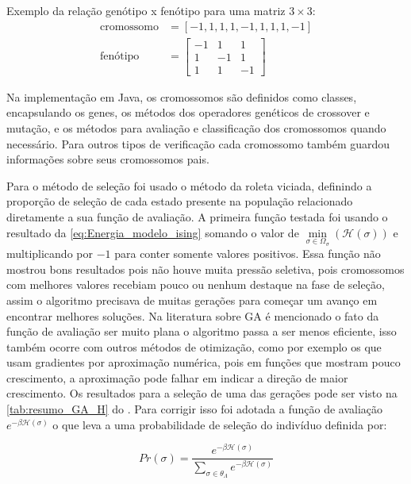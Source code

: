 Exemplo da relação genótipo x fenótipo para uma matriz \( 3 \times 3 \):
\begin{align*}
\text{cromossomo} &= \left[-1, 1, 1, 1, -1, 1, 1, 1, -1 \right]\\
\text{fenótipo} &= \begin{bmatrix}
-1 & 1 & 1 \\
1 & -1 & 1 \\
1 & 1 & -1
\end{bmatrix}
\end{align*}

Na implementação em Java, os cromossomos são definidos como classes, encapsulando os genes, os métodos dos operadores genéticos de crossover e mutação, e os métodos para avaliação e classificação dos cromossomos quando necessário. Para outros tipos de verificação cada cromossomo também guardou informações sobre seus cromossomos pais.

Para o método de seleção foi usado o método da roleta viciada, definindo a proporção de seleção de cada estado presente na população relacionado diretamente a sua função de avaliação. A primeira função testada foi usando o resultado da \autoref{eq:Energia_modelo_ising} somando o valor de \(\min\limits_{\sigma \in \Omega_{\sigma}}(\mathcal{H}(\sigma))\) e multiplicando por \(-1\) para conter somente valores positivos. Essa função não mostrou bons resultados pois não houve muita pressão seletiva, pois cromossomos com melhores valores recebiam pouco ou nenhum destaque na fase de seleção, assim o algoritmo precisava de muitas gerações para começar um avanço em encontrar melhores soluções. Na literatura sobre GA é mencionado o fato da função de avaliação ser muito plana o algoritmo passa a ser menos eficiente, isso também ocorre com outros métodos de otimização, como por exemplo os que usam gradientes por aproximação numérica, pois em funções que mostram pouco crescimento, a aproximação pode falhar em indicar a direção de maior crescimento. Os resultados para a seleção de uma das gerações pode ser visto na \autoref{tab:resumo_GA_H} do . Para corrigir isso foi adotada a função de avaliação \(e^{-\beta \mathcal{H}(\sigma)} \) o que leva a uma probabilidade de seleção do indivíduo definida por:

\begin{equation}
Pr(\sigma) = \frac{e^{-\beta \mathcal{H}(\sigma)}}{\sum_{\sigma \in \theta_{\Lambda}}e^{-\beta \mathcal{H}(\sigma)}}
\label{eq:selecao_modelo_ising}
\end{equation}

